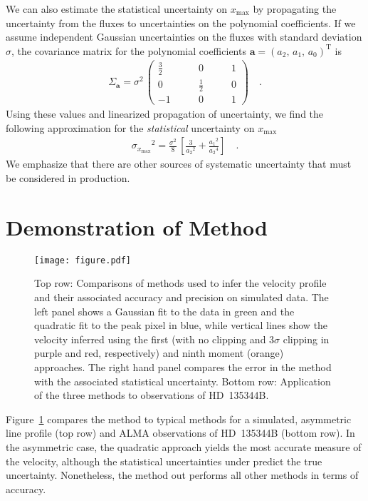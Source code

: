 \documentclass[rnaas]{aastex62}
\newcommand{\T}{\ensuremath{\mathrm{T}}}
\newcommand{\bvec}[1]{{\ensuremath{\boldsymbol{#1}}}}
\begin{document}
We can also estimate the statistical uncertainty on $x_\mathrm{max}$ by
propagating the uncertainty from the fluxes to uncertainties on the polynomial
coefficients.
If we assume independent Gaussian uncertainties on the fluxes with standard
deviation $\sigma$, the covariance matrix for the polynomial coefficients
$\bvec{a} = {(a_2,\,a_1,\,a_0)}^\T$ is
\begin{eqnarray}
\Sigma_\bvec{a} = \sigma^2\,\left(\begin{array}{ccc}
\frac{3}{2} \quad & \quad 0 \quad &\quad 1 \\
0\quad &\quad \frac{1}{2}\quad &\quad 0 \\
-1\quad &\quad 0\quad &\quad 1
\end{array}\right)\quad.
\end{eqnarray}
Using these values and linearized propagation of uncertainty, we find the
following approximation for the \emph{statistical} uncertainty on
$x_\mathrm{max}$
\begin{eqnarray}
{\sigma_{x_\mathrm{max}}}^2 = \frac{\sigma^2}{8}\,\left[
    \frac{3}{{a_2}^2} + \frac{{a_1}^2}{{a_2}^4}
\right]\quad.
\end{eqnarray}
We emphasize that there are other sources of systematic uncertainty that must
be considered in production.

\section{Demonstration of Method}

\begin{figure}[htbp]
\centering
\texttt{[image: figure.pdf]}
\caption{Top row: Comparisons of methods used to infer the velocity profile and their associated accuracy and precision on simulated data. The left panel shows a Gaussian fit to the data in green and the quadratic fit to the peak pixel in blue, while vertical lines show the velocity inferred using the first (with no clipping and $3\sigma$ clipping in purple and red, respectively) and ninth moment (orange) approaches. The right hand panel compares the error in the method with the associated statistical uncertainty. Bottom row: Application of the three methods to observations of HD~135344B. \label{figure}}
\end{figure}


Figure~\ref{figure} compares the method to typical methods for a simulated, asymmetric line profile (top row) and ALMA observations of HD~135344B (bottom row). In the asymmetric case, the quadratic approach yields the most accurate measure of the velocity, although the statistical uncertainties under predict the true uncertainty. Nonetheless, the method out performs all other methods in terms of accuracy.
\end{document}
